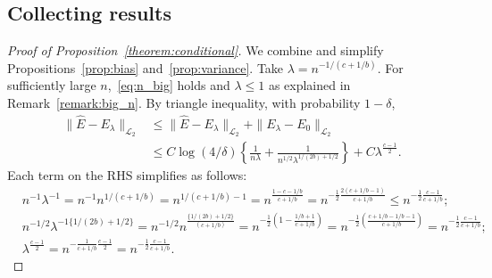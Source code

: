 \subsection{Collecting results}

\begin{proof}[Proof of Proposition~\ref{theorem:conditional}]
We combine and simplify Propositions~\ref{prop:bias} and~\ref{prop:variance}. Take $\lambda=n^{-1/(c+1/b)}$. For sufficiently large $n$,~\eqref{eq:n_big} holds and $\lambda\leq 1$ as explained in Remark~\ref{remark:big_n}. By triangle inequality, with probability $1-\delta$,
\begin{align*}
    \|\hat{E}-E_{\lambda}\|_{\mathcal{L}_2} &\leq  \|\hat{E}-E_{\lambda}\|_{\mathcal{L}_2}+ \|E_{\lambda}-E_0\|_{\mathcal{L}_2} \\
    &\leq  C\log(4/\delta) \left\{\frac{1}{n\lambda}+\frac{1}{n^{1/2}\lambda^{1/(2b)+1/2}}\right\}+C\lambda^{\frac{c-1}{2}}.
\end{align*}
Each term on the RHS simplifies as follows:
\begin{align*}
    &n^{-1}\lambda^{-1}
    =n^{-1}n^{1/(c+1/b)}
    =n^{1/(c+1/b)-1}
    =n^{\frac{1-c-1/b}{c+1/b}}
    =n^{-\frac{1}{2}\frac{2(c+1/b-1)}{c+1/b}} 
    \leq n^{-\frac{1}{2} \frac{c-1}{c+1/b}}; \\
    &n^{-1/2}\lambda^{-1\{1/(2b)+1/2\}}
    =n^{-1/2} n^{\frac{\{1/(2b)+1/2\}}{(c+1/b)}} 
    =n^{-\frac{1}{2}(1-\frac{1/b+1}{c+1/b})}
    =n^{-\frac{1}{2}(\frac{c+1/b-1/b-1}{c+1/b})}
    = n^{-\frac{1}{2}\frac{c-1}{c+1/b}};\\
    &\lambda^{\frac{c-1}{2}}
    = n^{-\frac{1}{c+1/b}\frac{c-1}{2}} =n^{-\frac{1}{2}\frac{c-1}{c+1/b}}.
\end{align*}
\end{proof}